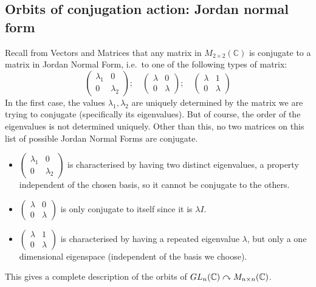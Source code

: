 \subsection{Orbits of conjugation action: Jordan normal form}
Recall from Vectors and Matrices that any matrix in \(M_{2 \times 2}(\mathbb C)\) is conjugate to a matrix in Jordan Normal Form, i.e.\ to one of the following types of matrix:
\[
	\begin{pmatrix}
		\lambda_1 & 0 \\ 0 & \lambda_2
	\end{pmatrix};\quad \begin{pmatrix}
		\lambda & 0 \\ 0 & \lambda
	\end{pmatrix};\quad \begin{pmatrix}
		\lambda & 1 \\ 0 & \lambda
	\end{pmatrix}
\]
In the first case, the values \(\lambda_1, \lambda_2\) are uniquely determined by the matrix we are trying to conjugate (specifically its eigenvalues).
But of course, the order of the eigenvalues is not determined uniquely.
Other than this, no two matrices on this list of possible Jordan Normal Forms are conjugate.
\begin{itemize}
	\item \(\begin{pmatrix}
		      \lambda_1 & 0 \\ 0 & \lambda_2
	      \end{pmatrix}\) is characterised by having two distinct eigenvalues, a property independent of the chosen basis, so it cannot be conjugate to the others.
	\item \(\begin{pmatrix}
		      \lambda & 0 \\ 0 & \lambda
	      \end{pmatrix}\) is only conjugate to itself since it is \(\lambda I\).
	\item \(\begin{pmatrix}
		      \lambda & 1 \\ 0 & \lambda
	      \end{pmatrix}\) is characterised by having a repeated eigenvalue \(\lambda\), but only a one dimensional eigenspace (independent of the basis we choose).
\end{itemize}
This gives a complete description of the orbits of \(GL_n(\mathbb C) \curvearrowright M_{n \times n}(\mathbb C)\).

